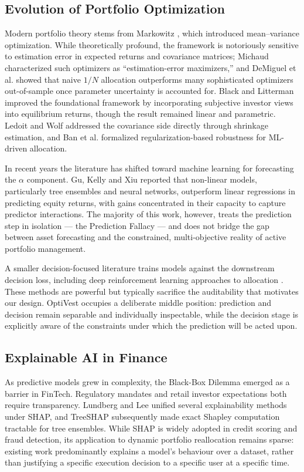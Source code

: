 \documentclass[conference]{IEEEtran}
\begin{document}
\subsection{Evolution of Portfolio Optimization}
Modern portfolio theory stems from Markowitz \cite{markowitz1952},
which introduced mean--variance optimization. While theoretically
profound, the framework is notoriously sensitive to estimation error in
expected returns and covariance matrices; Michaud \cite{michaud1989}
characterized such optimizers as ``estimation-error maximizers,'' and
DeMiguel et al. \cite{demiguel2009} showed that naive $1/N$ allocation
outperforms many sophisticated optimizers out-of-sample once parameter
uncertainty is accounted for. Black and Litterman
\cite{blacklitterman1992} improved the foundational framework by
incorporating subjective investor views into equilibrium returns,
though the result remained linear and parametric. Ledoit and Wolf
\cite{ledoit2004} addressed the covariance side directly through
shrinkage estimation, and Ban et al. \cite{ban2018} formalized
regularization-based robustness for ML-driven allocation.

In recent years the literature has shifted toward machine learning for
forecasting the $\alpha$ component. Gu, Kelly and Xiu \cite{gu2020}
reported that non-linear models, particularly tree ensembles and neural
networks, outperform linear regressions in predicting equity returns,
with gains concentrated in their capacity to capture predictor
interactions. The majority of this work, however, treats the
prediction step in isolation --- the Prediction Fallacy --- and does
not bridge the gap between asset forecasting and the constrained,
multi-objective reality of active portfolio management.

A smaller decision-focused literature trains models against the
downstream decision loss, including deep reinforcement learning
approaches to allocation \cite{jiang2017}. These methods are powerful
but typically sacrifice the auditability that motivates our design.
OptiVest occupies a deliberate middle position: prediction and decision
remain separable and individually inspectable, while the decision stage
is explicitly aware of the constraints under which the prediction will
be acted upon.

\subsection{Explainable AI in Finance}
As predictive models grew in complexity, the Black-Box Dilemma emerged
as a barrier in FinTech. Regulatory mandates and retail investor
expectations both require transparency. Lundberg and Lee
\cite{lundberg2017} unified several explainability methods under SHAP,
and TreeSHAP \cite{lundberg2020} subsequently made exact Shapley
computation tractable for tree ensembles. While SHAP is widely adopted
in credit scoring and fraud detection, its application to dynamic
portfolio reallocation remains sparse: existing work predominantly
explains a model's behaviour over a dataset, rather than justifying a
specific execution decision to a specific user at a specific time.
\end{document}
